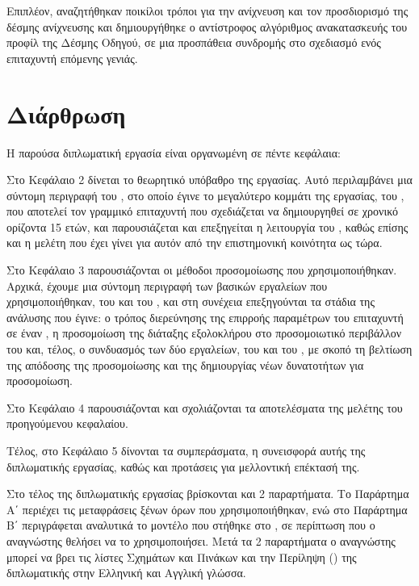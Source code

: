 Επιπλέον, αναζητήθηκαν ποικίλοι τρόποι για την ανίχνευση και τον προσδιορισμό της δέσμης ανίχνευσης και δημιουργήθηκε ο αντίστροφος αλγόριθμος ανακατασκευής του προφίλ της Δέσμης Οδηγού, σε μια προσπάθεια συνδρομής στο σχεδιασμό ενός επιταχυντή επόμενης γενιάς.

\section{Διάρθρωση}
Η παρούσα διπλωματική εργασία είναι οργανωμένη σε πέντε κεφάλαια:

Στο Κεφάλαιο 2 δίνεται το θεωρητικό υπόβαθρο της εργασίας. 
Αυτό περιλαμβάνει μια σύντομη περιγραφή του , στο οποίο έγινε το μεγαλύτερο κομμάτι της εργασίας, του , που αποτελεί τον γραμμικό επιταχυντή που σχεδιάζεται να δημιουργηθεί σε χρονικό ορίζοντα 15 ετών, και παρουσιάζεται και επεξηγείται η λειτουργία του , καθώς επίσης και η μελέτη που έχει γίνει για αυτόν από την επιστημονική κοινότητα ως τώρα.

Στο Κεφάλαιο 3 παρουσιάζονται οι μέθοδοι προσομοίωσης που χρησιμοποιήθηκαν.
Αρχικά, έχουμε μια σύντομη περιγραφή των βασικών εργαλείων που χρησιμοποιήθηκαν, του  και του , και στη συνέχεια επεξηγούνται τα στάδια της ανάλυσης που έγινε: ο τρόπος διερεύνησης της επιρροής παραμέτρων του επιταχυντή σε έναν , η προσομοίωση της διάταξης εξολοκλήρου στο προσομοιωτικό περιβάλλον του  και, τέλος, ο συνδυασμός των δύο εργαλείων, του  και του , με σκοπό τη βελτίωση της απόδοσης της προσομοίωσης και της δημιουργίας νέων δυνατοτήτων για προσομοίωση.

Στο Κεφάλαιο 4 παρουσιάζονται και σχολιάζονται τα αποτελέσματα της μελέτης του προηγούμενου κεφαλαίου.

Τέλος, στο Κεφάλαιο 5 δίνονται τα συμπεράσματα, η συνεισφορά αυτής της
διπλωματικής εργασίας, καθώς και προτάσεις για μελλοντική επέκτασή της.

Στο τέλος της διπλωματικής εργασίας βρίσκονται και 2 παραρτήματα.
Το Παράρτημα Α΄ περιέχει τις μεταφράσεις ξένων όρων που χρησιμοποιήθηκαν, ενώ στο Παράρτημα Β΄ περιγράφεται αναλυτικά το μοντέλο που στήθηκε στο , σε περίπτωση που ο αναγνώστης θελήσει να το χρησιμοποιήσει.
Μετά τα 2 παραρτήματα ο αναγνώστης μπορεί να βρει τις λίστες Σχημάτων και Πινάκων και την Περίληψη () της διπλωματικής στην Ελληνική και Αγγλική γλώσσα.